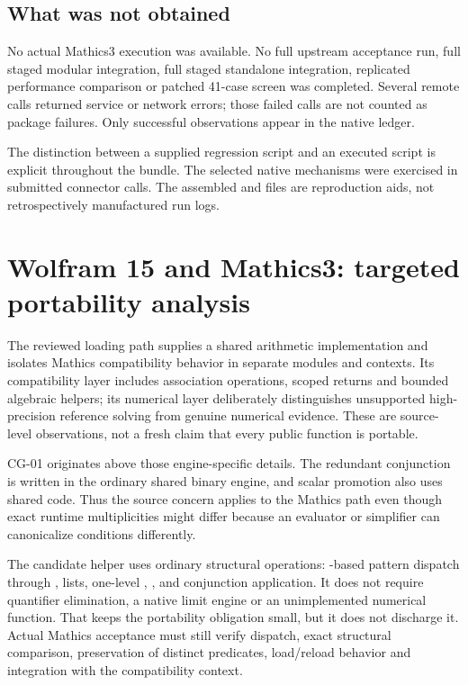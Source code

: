 \documentclass[11pt,a4paper]{article}
\newcommand{\code}[1]{\texttt{\detokenize{#1}}}
\begin{document}
\subsection{What was not obtained}
No actual Mathics3 execution was available. No full upstream acceptance run, full staged modular integration, full staged standalone integration, replicated performance comparison or patched 41-case screen was completed. Several remote calls returned service or network errors; those failed calls are not counted as package failures. Only successful observations appear in the native ledger.

The distinction between a supplied regression script and an executed script is explicit throughout the bundle. The selected native mechanisms were exercised in submitted connector calls. The assembled  and  files are reproduction aids, not retrospectively manufactured run logs.

\section{Wolfram 15 and Mathics3: targeted portability analysis}
\label{sec:portability}
The reviewed loading path supplies a shared arithmetic implementation and isolates Mathics compatibility behavior in separate modules and contexts. Its compatibility layer includes association operations, scoped returns and bounded algebraic helpers; its numerical layer deliberately distinguishes unsupported high-precision reference solving from genuine numerical evidence. These are source-level observations, not a fresh claim that every public function is portable.\cite{mathicscompat,mathicsnumeric,loader}

CG-01 originates above those engine-specific details. The redundant conjunction is written in the ordinary shared binary engine, and scalar promotion also uses shared code. Thus the source concern applies to the Mathics path even though exact runtime multiplicities might differ because an evaluator or simplifier can canonicalize conditions differently.

The candidate helper uses ordinary structural operations: \code{Head}-based pattern dispatch through \code{And}, lists, one-level \code{Flatten}, \code{Join}, \code{DeleteDuplicates} and conjunction application. It does not require quantifier elimination, a native limit engine or an unimplemented numerical function. That keeps the portability obligation small, but it does not discharge it. Actual Mathics acceptance must still verify dispatch, exact structural comparison, preservation of distinct predicates, load/reload behavior and integration with the compatibility context.
\end{document}
